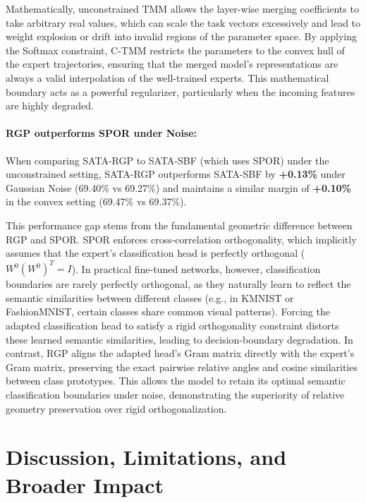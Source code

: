 \documentclass{article}
\begin{document}
Mathematically, unconstrained TMM allows the layer-wise merging coefficients to take arbitrary real values, which can scale the task vectors excessively and lead to weight explosion or drift into invalid regions of the parameter space. By applying the Softmax constraint, C-TMM restricts the parameters to the convex hull of the expert trajectories, ensuring that the merged model's representations are always a valid interpolation of the well-trained experts. This mathematical boundary acts as a powerful regularizer, particularly when the incoming features are highly degraded.

\paragraph{RGP outperforms SPOR under Noise:}
When comparing SATA-RGP to SATA-SBF (which uses SPOR) under the unconstrained setting, SATA-RGP outperforms SATA-SBF by \textbf{+0.13\%} under Gaussian Noise (69.40\% vs 69.27\%) and maintains a similar margin of \textbf{+0.10\%} in the convex setting (69.47\% vs 69.37\%). 

This performance gap stems from the fundamental geometric difference between RGP and SPOR. SPOR enforces cross-correlation orthogonality, which implicitly assumes that the expert's classification head is perfectly orthogonal ($W^0 (W^0)^T = I$). In practical fine-tuned networks, however, classification boundaries are rarely perfectly orthogonal, as they naturally learn to reflect the semantic similarities between different classes (e.g., in KMNIST or FashionMNIST, certain classes share common visual patterns). Forcing the adapted classification head to satisfy a rigid orthogonality constraint distorts these learned semantic similarities, leading to decision-boundary degradation. In contrast, RGP aligns the adapted head's Gram matrix directly with the expert's Gram matrix, preserving the exact pairwise relative angles and cosine similarities between class prototypes. This allows the model to retain its optimal semantic classification boundaries under noise, demonstrating the superiority of relative geometry preservation over rigid orthogonalization.

\section{Discussion, Limitations, and Broader Impact}
\label{sec:discussion}
\end{document}
